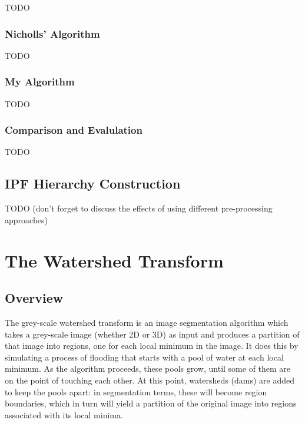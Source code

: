 TODO

\subsubsection{Nicholls' Algorithm}

TODO

\subsubsection{My Algorithm}
\label{subsubsec:segmentation-waterfall-myalgorithm}

TODO

\subsubsection{Comparison and Evalulation}

TODO

\subsection{IPF Hierarchy Construction}

TODO (don't forget to discuss the effects of using different pre-processing approaches)

\fi

\iffalse

\section{The Watershed Transform}

\subsection{Overview}

The grey-scale watershed transform is an image segmentation algorithm which takes a grey-scale image (whether 2D or 3D) as input and produces a partition of that image into regions, one for each local minimum in the image. It does this by simulating a process of flooding that starts with a pool of water at each local minimum. As the algorithm proceeds, these pools grow, until some of them are on the point of touching each other. At this point, watersheds (dams) are added to keep the pools apart: in segmentation terms, these will become region boundaries, which in turn will yield a partition of the original image into regions associated with its local minima.


